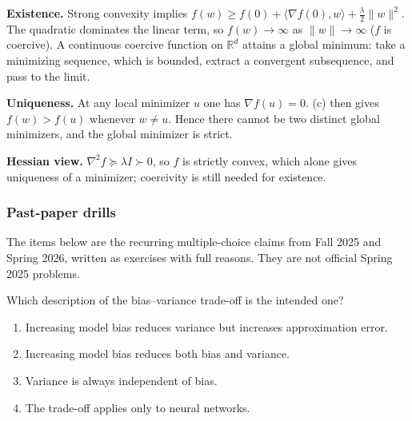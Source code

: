 \begin{solution}
\textbf{Existence.}
Strong convexity implies $f(w)\ge f(0)+\langle\nabla f(0),w\rangle+\frac{\lambda}{2}\lVert w\rVert^2$. The quadratic dominates the linear term, so $f(w)\to\infty$ as $\lVert w\rVert\to\infty$ ($f$ is coercive). A continuous coercive function on $\mathbb{R}^d$ attains a global minimum: take a minimizing sequence, which is bounded, extract a convergent subsequence, and pass to the limit.

\textbf{Uniqueness.}
At any local minimizer $u$ one has $\nabla f(u)=0$. (c) then gives $f(w)>f(u)$ whenever $w\ne u$. Hence there cannot be two distinct global minimizers, and the global minimizer is strict.

\textbf{Hessian view.}
$\nabla^2 f\succeq\lambda I\succ 0$, so $f$ is strictly convex, which alone gives uniqueness of a minimizer; coercivity is still needed for existence.
\end{solution}


\subsubsection{Past-paper drills}
\label{subsubsec:mlu-drills}

The items below are the recurring multiple-choice claims from Fall 2025 and Spring 2026, written as exercises with full reasons. They are not official Spring 2025 problems.

\begin{exercise}
\label{ex:mlu-bv-mcq}
Which description of the bias--variance trade-off is the intended one?
\begin{enumerate}[label=(\alph*)]
    \item Increasing model bias reduces variance but increases approximation error.
    \item Increasing model bias reduces both bias and variance.
    \item Variance is always independent of bias.
    \item The trade-off applies only to neural networks.
\end{enumerate}
\end{exercise}

